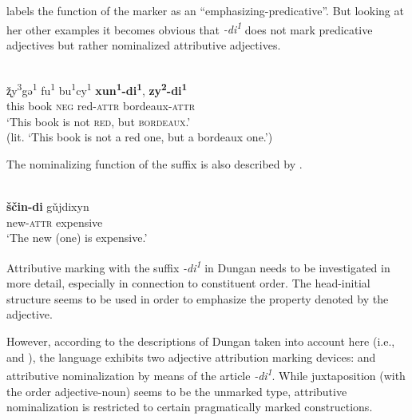 \citet[82]{zevachina2001} labels the function of the marker as an “emphasizing\hyp{}predicative”. But looking at her other examples it becomes obvious that \textit{-di\textsuperscript{1}} does not mark predicative adjectives but rather nominalized attributive adjectives.
\begin{exe}
\\
\gll	ž̨y\textsuperscript{3}gə\textsuperscript{1} fu\textsuperscript{1} bu\textsuperscript{1}cy\textsuperscript{1} \textbf{xun\textsuperscript{1}-di\textsuperscript{1}}, \textbf{zy\textsuperscript{2}-di\textsuperscript{1}}\\
	this book \textsc{neg} red-\textsc{attr} bordeaux-\textsc{attr}\\
\glt	‘This book is not \textsc{red}, but \textsc{bordeaux}.’\\
	(lit. ‘This book is not a red one, but a bordeaux one.’)
\end{exe}
The nominalizing function of the suffix is also described by \citet{kalimov1968}.
\begin{exe}
\\
\label{dungan nmlz}
\gll	\textbf{ščin-di} gǔjdixyn\\
	new-\textsc{attr} expensive\\
\glt	‘The new (one) is expensive.’
\end{exe}
Attributive marking with the suffix \textit{-di\textsuperscript{1}} in Dungan needs to be investigated in more detail, especially in connection to constituent order. The head-initial structure seems to be used in order to emphasize the property denoted by the adjective.

However, according to the descriptions of Dungan taken into account here (i.e., \citealt{kalimov1968} and \citealt{zevachina2001}), the language exhibits two adjective attribution marking devices:  and attributive nominalization by means of the article \textit{-di\textsuperscript{1}}. While juxtaposition (with the order adjective-noun) seems to be the unmarked type, attributive nominalization is restricted to certain pragmatically marked constructions.

